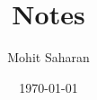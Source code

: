 \documentclass[a4paper,12pt]{book}
\begin{document}
\author{Mohit Saharan}
\title{Notes}
\date{\today}

\frontmatter
\maketitle
\tableofcontents

\mainmatter



%

\backmatter
\printbibliography
\end{document}
